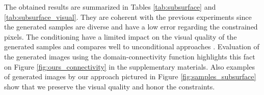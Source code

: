 
The obtained results are summarized in Tables \ref{tab:subsurface} and \ref{tab:subsurface_visual}. They are coherent with the previous experiments since the generated samples are diverse and have a low error regarding the constrained pixels. The conditioning have a limited impact on the visual quality of the generated samples and compares well to unconditional approaches \citep{Ruffino2017}. Evaluation of the generated images using the domain-connectivity function highlights this fact on Figure \ref{fig:ours_connectivity} in the supplementary materials. Also examples of generated images by our approach  pictured in Figure \ref{fig:samples_subsurface} show that we preserve the visual quality and honor the constraints.

